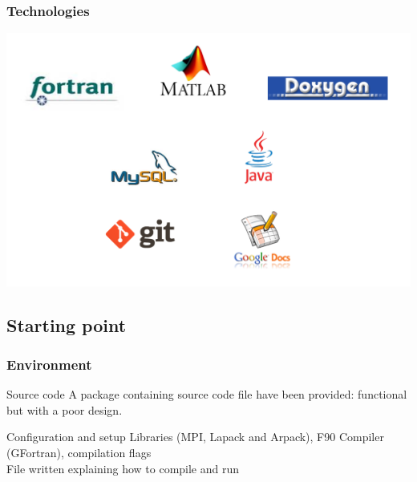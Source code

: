 \documentclass[10p]{beamer}
\begin{document}
\begin{frame}
\frametitle{Technologies}
\includegraphics[width=\textwidth]{Image/logos.png}
\end{frame}
\subsection{Starting point}

\begin{frame}
\frametitle{Environment}
\begin{block}{Source code}
A package containing source code file have been provided: functional but with a poor design.
\end{block}
\begin{block}{Configuration and setup}
Libraries (MPI, Lapack and Arpack), F90 Compiler (GFortran), compilation flags
\\File written explaining how to compile and run
\end{block}
\end{frame}
\end{document}
